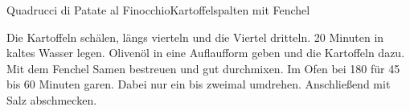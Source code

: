 \begin{recipe}{Quadrucci di Patate al Finocchio}{Kartoffelspalten mit Fenchel}
  \inglist
  
  \steps
  Die Kartoffeln schälen, längs vierteln und die Viertel dritteln. 20 Minuten in kaltes
  Wasser legen. Olivenöl in eine Auflaufform geben und die Kartoffeln dazu. Mit dem
  Fenchel Samen bestreuen und gut durchmixen. Im Ofen bei 180 \celsius für 45 bis 60
  Minuten garen. Dabei nur ein bis zweimal umdrehen. Anschließend mit Salz abschmecken.
\end{recipe}
